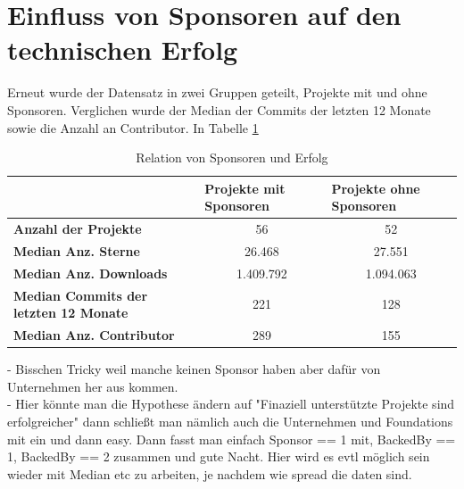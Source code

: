 \newpage %
\section{Einfluss von Sponsoren auf den technischen Erfolg}

Erneut wurde der Datensatz in zwei Gruppen geteilt, Projekte mit und ohne Sponsoren. Verglichen wurde
der Median der Commits der letzten 12 Monate sowie die Anzahl an Contributor. In Tabelle \ref{}

\begin{table}[h]
    \begin{tabular}{l|c|c|}
        \cline{2-3}
                                                      & \multicolumn{1}{l|}{\textbf{Projekte mit Sponsoren}} & \multicolumn{1}{l|}{\textbf{Projekte ohne Sponsoren}} \\ \hline
        \textbf{Anzahl der Projekte}                  & 56                                                   & 52                                                    \\ \hline
        \textbf{Median Anz. Sterne}                   & 26.468                                               & 27.551                                                \\ \hline
        \textbf{Median Anz. Downloads}                & 1.409.792                                            & 1.094.063                                             \\ \hline
        \textbf{Median Commits der letzten 12 Monate} & 221                                                  & 128                                                   \\ \hline
        \textbf{Median Anz. Contributor}              & 289                                                  & 155                                                   \\ \hline
    \end{tabular}%
    \caption{Relation von Sponsoren und Erfolg}
    \label{tab:Sponsors_vs_NonSponsors}
\end{table}

- Bisschen Tricky weil manche keinen Sponsor haben aber dafür von Unternehmen her aus kommen.\\
- Hier könnte man die Hypothese ändern auf "Finaziell unterstützte Projekte sind erfolgreicher"
dann schließt man nämlich auch die Unternehmen und Foundations mit ein und dann easy. Dann fasst man einfach
Sponsor == 1 mit, BackedBy == 1, BackedBy == 2 zusammen und gute Nacht. Hier wird es evtl möglich sein
wieder mit Median etc zu arbeiten, je nachdem wie spread die daten sind.